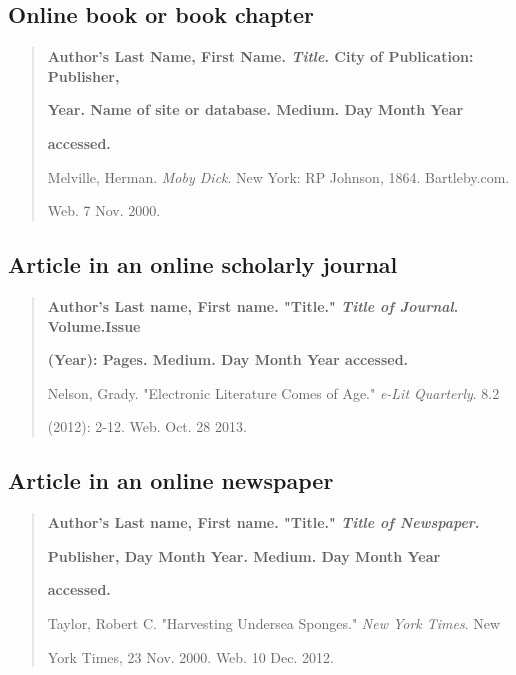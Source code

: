 \subsection{Online book or book chapter}
\begin{quote}
\textbf{Author's Last Name, First Name. \emph{Title}. City of Publication: Publisher,}

\hspace{.4in}\textbf{Year. Name of site or database. Medium. Day Month Year} 

\hspace{.4in}\textbf{accessed.}

\medskip
Melville, Herman. \emph{Moby Dick}. New York: RP Johnson, 1864. Bartleby.com. 

\hspace{.4in}Web. 7 Nov. 2000.
\end{quote}

\subsection{Article in an online scholarly journal}

\begin{quote}
\textbf{Author's Last name, First name. "Title." \emph{Title of Journal}. Volume.Issue} 

\hspace{.4in}\textbf{(Year): Pages. Medium. Day Month Year accessed.}

\medskip

Nelson, Grady. "Electronic Literature Comes of Age." \emph{e-Lit Quarterly}. 8.2 

\hspace{.4in}(2012): 2-12. Web. Oct. 28 2013.

\end{quote}

\subsection{Article in an online newspaper}

\begin{quote}
\textbf{Author's Last name, First name. "Title." \emph{Title of Newspaper}.}

\hspace{.4in}\textbf{Publisher, Day Month Year. Medium. Day Month Year}

\hspace{.4in}\textbf{accessed.}

\medskip

Taylor, Robert C. "Harvesting Undersea Sponges." \emph{New York Times}. New 

\hspace{.4in}York Times, 23 Nov. 2000. Web. 10 Dec. 2012.

\end{quote}

